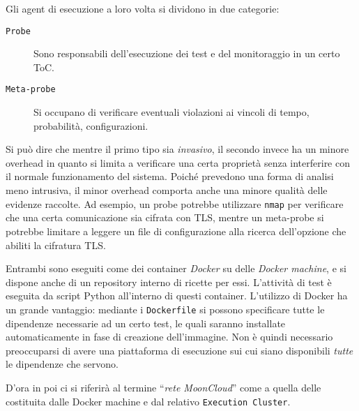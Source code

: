 Gli agent di esecuzione a loro volta si dividono in due categorie:
\begin{description}
    \item[\texttt{Probe}]Sono responsabili dell'esecuzione dei test e del
    monitoraggio in un certo ToC.
    \item[\texttt{Meta-probe}]Si occupano di verificare eventuali violazioni ai
    vincoli di tempo, probabilità, configurazioni. 
\end{description}
Si può dire che mentre il primo tipo sia \textit{invasivo}, il secondo invece
ha un minore overhead in quanto si limita a verificare una certa proprietà
senza interferire con il normale funzionamento del sistema.
Poiché prevedono una forma di analisi meno intrusiva, il minor overhead comporta
anche una minore qualità delle evidenze raccolte.
Ad esempio, un probe potrebbe utilizzare \texttt{nmap} per verificare che
una certa comunicazione sia cifrata con TLS, mentre un meta-probe si
potrebbe limitare a leggere un file di configurazione alla ricerca dell'opzione
che abiliti la cifratura TLS.

Entrambi sono eseguiti come dei container \textit{Docker} su delle \textit{Docker machine},
e si dispone anche di un repository interno di ricette per essi.
L'attività di test è eseguita da script Python all'interno di questi container.
L'utilizzo di Docker ha un grande vantaggio: mediante i \texttt{Dockerfile} si possono
specificare tutte le dipendenze necessarie ad un certo test, le quali saranno
installate automaticamente in fase di creazione dell'immagine. Non è quindi necessario
preoccuparsi di avere una piattaforma di esecuzione sui cui siano disponibili \textit{tutte}
le dipendenze che servono.

D'ora in poi ci si riferirà al termine ``\textit{rete MoonCloud}'' come a quella
delle costituita dalle Docker machine e dal relativo \texttt{Execution Cluster}.
